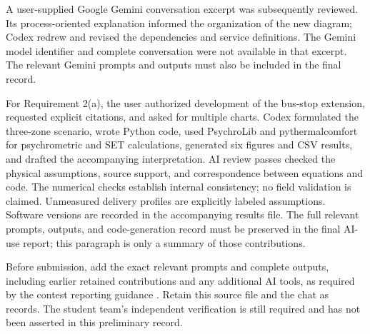 \documentclass[12pt]{article}
\begin{document}
A user-supplied Google Gemini conversation excerpt was subsequently reviewed.
Its process-oriented explanation informed the organization of the new diagram;
Codex redrew and revised the dependencies and service definitions. The Gemini
model identifier and complete conversation were not available in that excerpt.
The relevant Gemini prompts and outputs must also be included in the final record.

For Requirement 2(a), the user authorized development of the bus-stop extension,
requested explicit citations, and asked for multiple charts. Codex formulated the
three-zone scenario, wrote Python code, used PsychroLib and pythermalcomfort for
psychrometric and SET calculations, generated six figures and CSV results, and
drafted the accompanying interpretation. AI review passes checked the physical
assumptions, source support, and correspondence between equations and code.
The numerical checks establish internal consistency; no field validation is
claimed. Unmeasured delivery profiles are explicitly labeled assumptions.
Software versions are recorded in the accompanying results file. The full
relevant prompts, outputs, and code-generation record must be preserved in the
final AI-use report; this paragraph is only a summary of those contributions.

Before submission, add the exact relevant prompts and complete outputs,
including earlier retained contributions and any additional AI tools, as
required by the contest reporting guidance \cite{aipolicy}. Retain this source
file and the chat as records. The student team's independent verification is
still required and has not been asserted in this preliminary record.
\end{document}
